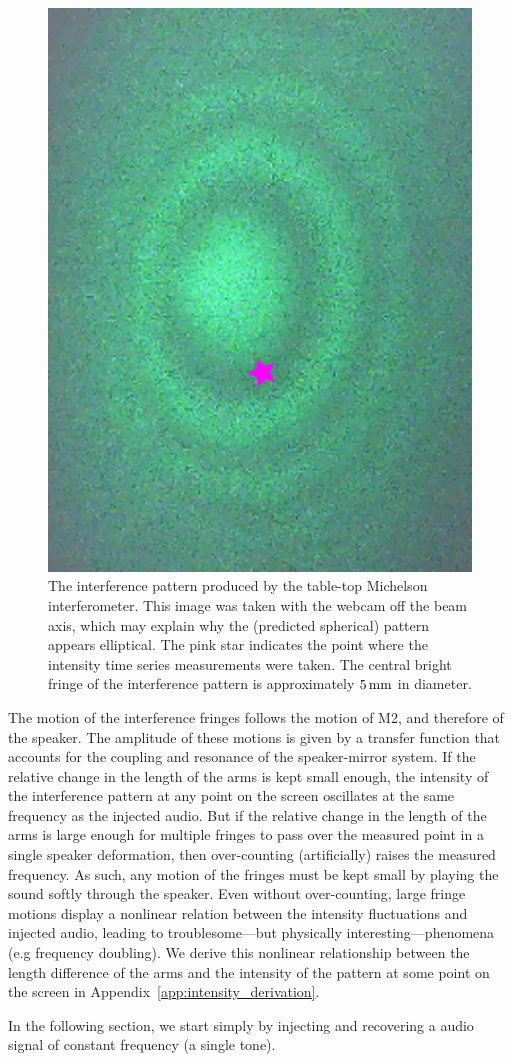 \documentclass[paper-main.tex]{subfiles}
\begin{document}
\begin{figure}
 \begin{center}
  \includegraphics[height=.45\textwidth, angle=-90]{figures/webcam_still0_star.pdf}
 \end{center}
 \caption{\label{fig:interference_pattern}
The interference pattern produced by the table-top Michelson interferometer.
This image was taken with the webcam off the beam axis, which may explain why the (predicted spherical) pattern appears elliptical.
The pink star indicates the point where the intensity time series measurements were taken.
The central bright fringe of the interference pattern is approximately $5\,{\rm mm}$ in diameter. 
}
\end{figure}

The motion of the interference fringes follows the motion of M2, and therefore of the speaker.
The amplitude of these motions is given by a transfer function that accounts for the coupling and resonance of the speaker-mirror system.
If the relative change in the length of the arms is kept small enough, the intensity of the interference pattern at any point on the screen oscillates at the same frequency as the injected audio.
But if the relative change in the length of the arms is large enough for multiple fringes to pass over the measured point in a single speaker deformation, then over-counting (artificially) raises the measured frequency.
As such, any motion of the fringes must be kept small by playing the sound softly through the speaker.
Even without over-counting, large fringe motions display a nonlinear relation between the intensity fluctuations and injected audio, leading to troublesome---but physically interesting---phenomena (e.g frequency doubling).
We derive this nonlinear relationship between the length difference of the arms and the intensity of the pattern at some point on the screen in Appendix~\ref{app:intensity_derivation}.


In the following section, we start simply by injecting and recovering a audio signal of constant frequency (a single tone).

\end{document}
